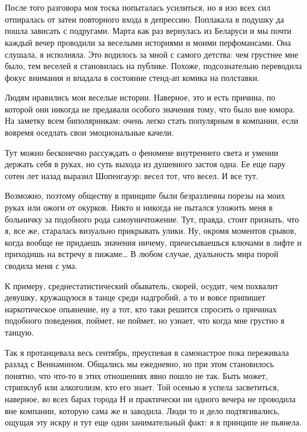\documentclass[
]{book}
\begin{document}
\hypertarget{chapter-78}{%
\chapter{~}\label{chapter-78}}

После того разговора моя тоска попыталась усилиться, но я изо всех сил отпиралась от затеи повторного входа в депрессию. Поплакала в подушку да пошла зависать с подругами. Марта как раз вернулась из Беларуси и мы почти каждый вечер проводили за веселыми историями и моими перфомансами. Она слушала, я исполняла. Это водилось за мной с самого детства: чем грустнее мне было, тем веселей я становилась на публике. Похоже, подсознательно переводила фокус внимания и впадала в состояние стенд-ап комика на полставки.

Людям нравились мои веселые истории. Наверное, это и есть причина, по которой они никогда не предавали особого значения тому, что было вне юмора. На заметку всем биполярникам: очень легко стать популярным в компании, если вовремя оседлать свои эмоциональные качели.

Тут можно бесконечно рассуждать о феномене внутреннего света и умении держать себя в руках, но суть выхода из душевного застоя одна. Ее еще пару сотен лет назад выразил Шопенгауэр: весел тот, что весел. И все тут.

Возможно, поэтому обществу в принципе были безразличны порезы на моих руках или ожоги от окурков. Никто и никогда не пытался уложить меня в больничку за подобного рода самоуничтожение. Тут, правда, стоит признать, что я, все же, старалась визуально прикрывать улики. Ну, окромя моментов срывов, когда вообще не придаешь значения ничему, причесываешься ключами в лифте и приходишь на встречу в пижаме\ldots{} В любом случае, дуальность мира порой сводила меня с ума.

К примеру, среднестатистический обыватель, скорей, осудит, чем похвалит девушку, кружащуюся в танце среди надгробий, а то и вовсе припишет наркотическое опьянение, ну а тот, кто таки решится спросить о причинах подобного поведения, поймет, не поймет, но узнает, что когда мне грустно я танцую.

Так я протанцевала весь сентябрь, преуспевая в самонастрое пока переживала разлад с Вениамином. Общались мы ежедневно, но при этом становилось понятно, что что-то в этих отношениях явно пошло не так. Быть может, стрипклуб или алкоголизм, кто его знает. Той осенью я успела засветиться, наверное, во всех барах города Н и практически ни одного вечера не проводила вне компании, которую сама же и заводила. Люди то и дело подтягивались, ощущая эту искру и тут еще один занимательный факт: я в принципе не пьянела.
\end{document}
